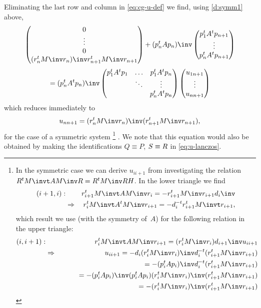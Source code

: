 \documentclass[11pt]{artikel3}
\begin{document}
\begin{Outline}
Eliminating the last row and column in \eqref{eq:cg-u-def}
we find, using \eqref{d:symm1} above,
\[
        \begin{pmatrix}0\cr \vdots \cr 0 \cr
                (r_n^tM\inv r_n)\inv r_{n+1}^tM\inv r_{n+1}\end{pmatrix}
        +(p_n^tAp_n)\inv\begin{pmatrix}p_1^tA^tp_{n+1}\cr\vdots\cr p_n^tA^tp_{n+1}\end{pmatrix}
\]
\begin{equation}
        = (p_n^tA^tp_n)\inv
        \begin{pmatrix}p_1^tA^tp_1&\ldots&p_1^tA^tp_n\cr
                &\ddots&\vdots\cr
                &&p_n^tA^tp_n\end{pmatrix}
        \begin{pmatrix}u_{1n+1}\cr \vdots \cr u_{nn+1}\end{pmatrix}
\end{equation}
which reduces immediately to
\begin{equation}
    u_{nn+1}=(r_n^tM\inv r_n)\inv (r_{n+1}^tM\inv r_{n+1}),
    \label{eq:u-symm}\end{equation}
for the case of a symmetric system%
\footnote{In the symmetric case we can derive $u_{ii+1}$ from
investigating the relation $R^tM\invt AM\inv R=R^tM\inv RH$.
In the lower triangle we find
\begin{eqnarray*}
  (i+1,i):&&
    r_{i+1}^tM\invt AM\inv r_i=-r_{i+1}^tM\inv r_{i+1} d_i\inv \\
    &\Rightarrow&
    r_i^tM\invt A^tM\inv r_{i+1}=- d_i^{-t}r_{i+1}^tM\invt r_{i+1},
    \end{eqnarray*}
which result we use (with the symmetry of~$A$) for the following
relation in the upper triangle:
\begin{eqnarray*}
   (i,i+1):&&
    r_i^tM\invt AM\inv r_{i+1}=(r_i^tM\inv r_i) d_{i+1}\inv u_{ii+1}\\
    &\Rightarrow& u_{ii+1}=
      - d_i(r_i^tM\inv r_i)\inv d_i^{-t}(r_{i+1}^tM\inv r_{i+1})\\
    &&\hphantom{u_{ii+1}}=
      -(p_i^tAp_i)\inv d_i^{-t}(r_{i+1}^tM\inv r_{i+1})\\
    &&\hphantom{u_{ii+1}}=
      -(p_i^tAp_i)\inv (p_i^tAp_i)(r_i^tM\inv r_i)\inv (r_{i+1}^tM\inv r_{i+1})\\
    &&\hphantom{u_{ii+1}}=
      -(r_i^tM\inv r_i)\inv(r_{i+1}^tM\inv r_{i+1})
    \end{eqnarray*}
}%
.
We note that this equation would also be obtained
by making the identifications $Q\equiv P$, $S\equiv\nobreak R$
in \eqref{eq:u-lanczos}.


\end{Outline}
\end{document}
